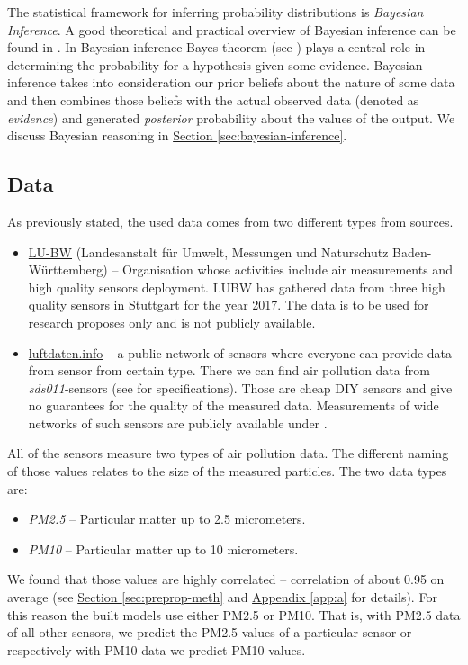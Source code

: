\documentclass[12pt,a4paper,twoside]{scrartcl}
\numberwithin{equation}{section}
\newcommand{\refsec}[1]{\hyperref[#1]{Section \ref*{#1}}}
\newcommand{\refapp}[1]{\hyperref[#1]{Appendix \ref*{#1}}}
\begin{document}
The statistical framework for inferring probability distributions is \emph{Bayesian Inference}. A good theoretical and practical overview of Bayesian inference can be found in \cite{tipping2004}. In Bayesian inference Bayes theorem (see \cite{bayes63}) plays a central role in determining the probability for a hypothesis given some evidence. Bayesian inference takes into consideration our prior beliefs about the nature of some data and then combines those beliefs with the actual observed data (denoted as \emph{evidence}) and generated \emph{posterior} probability about the values of the output. We discuss Bayesian reasoning in \refsec{sec:bayesian-inference}.
\subsection{Data}\label{sec:data}
As previously stated, the used data comes from two different types from sources.
\begin{itemize}
\item \href{https://www.lubw.baden-wuerttemberg.de/startseite}{LU-BW} (Landesanstalt für Umwelt, Messungen und Naturschutz Baden-Württemberg) -- Organisation whose activities include air measurements and high quality sensors deployment. LUBW has gathered data from three high quality sensors in Stuttgart for the year 2017. The data is to be used for research proposes only and is not publicly available.
\item \href{https://luftdaten.info/}{luftdaten.info} -- a public network of sensors where everyone can provide data from sensor from certain type. There we can find air pollution data from \emph{sds011}-sensors (see \cite{sds011}  for specifications). Those are cheap DIY sensors and give no guarantees for the quality of the measured data. Measurements of wide networks of such sensors are publicly available under \cite{luftdaten}.
\end{itemize}
All of the sensors measure two types of air pollution data. The different naming of those values relates to the size of the measured particles. The two data types are:
\begin{itemize}
\item \emph{PM2.5} -- Particular matter up to 2.5 micrometers.
\item \emph{PM10} -- Particular matter up to 10 micrometers.
\end{itemize}
We found that those values are highly correlated -- correlation of about 0.95 on average (see \refsec{sec:preprop-meth} and \refapp{app:a} for details). For this reason the built models use either PM2.5 or PM10. That is, with PM2.5 data of all other sensors, we predict the PM2.5 values of a particular sensor or respectively with PM10 data we predict PM10 values.
\end{document}

